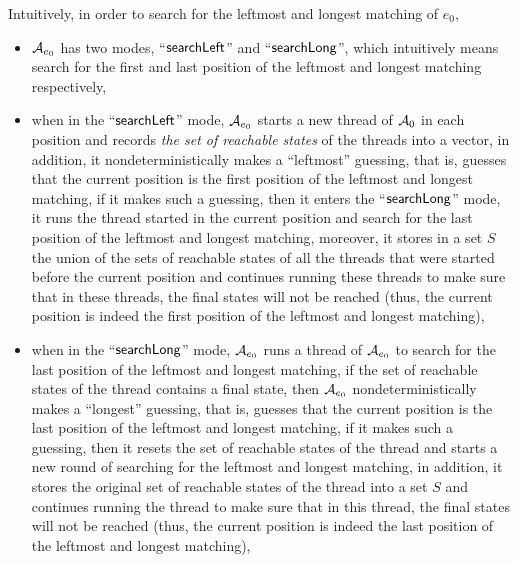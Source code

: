 %
Intuitively, in order to search for the leftmost and longest matching of $e_0$, 
\begin{itemize}
\item $\mathcal{A}_{e_0}$ has two modes, ``$\mathsf{searchLeft}$'' and ``$\mathsf{searchLong}$'', which intuitively means search for the first and last position of the leftmost and longest matching respectively,
	\item when in the ``$\mathsf{searchLeft}$'' mode, $\mathcal{A}_{e_0}$ starts a new thread of $\mathcal{A}_0$ in each position and records \emph{the set of reachable states} of the threads into a vector, in addition, it nondeterministically makes a ``leftmost'' guessing, that is, guesses that the current position is the first position of the leftmost and longest matching, if it makes such a guessing, then it enters the ``$\mathsf{searchLong}$'' mode, it runs the thread started in the current position and search for the last position of the leftmost and longest matching, moreover, it stores in a set $S$ the union of the sets of reachable states of all the threads that were started before the current position and continues running these threads to make sure that in these threads, the final states will not be reached (thus, the current position is indeed the first position of the leftmost and longest matching),
	\item when in the ``$\mathsf{searchLong}$'' mode, $\mathcal{A}_{e_0}$ runs a thread of $\mathcal{A}_{e_0}$ to search for the last position of the leftmost and longest matching, if the set of reachable states of the thread contains a final state, then $\mathcal{A}_{e_0}$ nondeterministically makes a ``longest'' guessing, that is, guesses that the current position is the last position of the leftmost and longest matching, if it makes such a guessing, then it resets the set of reachable states of the thread and starts a new round of searching for the leftmost and longest matching, in addition, it stores the original set of reachable states of the thread into a set $S$ and continues running the thread to make sure that in this thread, the final states  will not be reached (thus, the current position is indeed the last position of the leftmost and longest matching),

\end{itemize}
